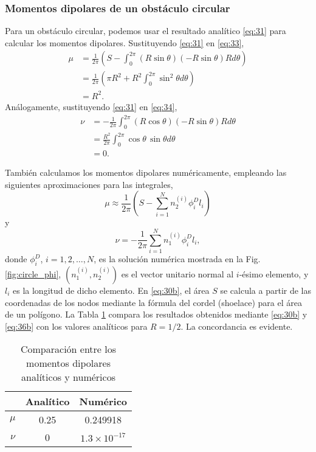 \documentclass[11pt]{article}
\begin{document}
\subsubsection{Momentos dipolares de un obstáculo circular}
Para un obstáculo circular, podemos usar el resultado analítico \eqref{eq:31} para calcular los momentos dipolares. Sustituyendo \eqref{eq:31} en \eqref{eq:33},
\begin{align}
  \label{eq:35}
  \mu &= \frac{1}{2\pi}\left(S - \int_0^{2\pi} (R\sin\theta) (-R\sin\theta) Rd\theta\right) \\
      &= \frac{1}{2\pi}\left(\pi R^2 + R^2\int_0^{2\pi} \sin^2\theta d\theta \right) \\
  & = R^2.
\end{align}
Análogamente, sustituyendo \eqref{eq:31} en \eqref{eq:34},
\begin{align}
  \nu &=  -\frac{1}{2\pi}  \int_0^{2\pi} (R\cos\theta)(-R\sin\theta) R d\theta \\
      &= \frac{R^2}{2\pi} \int_0^{2\pi} \cos\theta\,\sin\theta d\theta \\
  &= 0.
\end{align}

También calculamos los momentos dipolares numéricamente, empleando las siguientes aproximaciones para las integrales,
\begin{equation}
  \label{eq:30b}
  \mu \approx \frac{1}{2\pi}\left(S - \sum_{i=1}^N n_2^{(i)} \phi_i^D l_i\right)
\end{equation}
y
\begin{equation}
  \label{eq:36b}
  \nu =- \frac{1}{2\pi}\sum_{i=1}^N n_1^{(i)} \phi_i^D l_i,
\end{equation}
donde
$\phi^D_i$, $i=1,2,\ldots,N$, es la solución numérica mostrada en la Fig. \ref{fig:circle_phi}, $\left(n_1^{(i)}, n_2^{(i)}\right)$ es el vector unitario normal al $i$-ésimo elemento, y $l_i$ es la longitud de dicho elemento. En \eqref{eq:30b}, el área $S$ se calcula a partir de las coordenadas de los nodos mediante la fórmula del cordel (shoelace) para el área de un polígono. La Tabla \ref{tab:dipole} compara los resultados obtenidos mediante \eqref{eq:30b} y \eqref{eq:36b} con los valores analíticos para $R=1/2$. La concordancia es evidente.
\begin{table}[h]
  \centering
\begin{tabular}{c|c|c}
      & Analítico & Numérico \\ \hline
$\mu$ &     0.25   & 0.249918          \\ \hline
$\nu$ &     0      & $1.3 \times 10^{-17}$
\end{tabular}  \caption{Comparación entre los momentos dipolares analíticos y numéricos}
  \label{tab:dipole}
\end{table}
\clearpage



 
\end{document}
